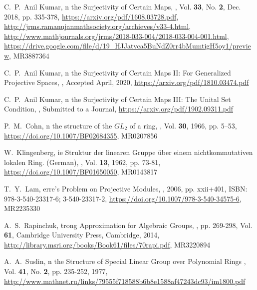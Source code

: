 \documentclass[12pt]{amsart}
\theoremstyle{plain}
\theoremstyle{definition}
\theoremstyle{remark}
\numberwithin{equation}{section}
\begin{document}
\begin{thebibliography}{1}

C.~P.~Anil Kumar,
n the {S}urjectivity of {C}ertain {M}aps,
, Vol. {\bf 33}, No. {\bf 2}, Dec. 2018, pp. 335-378, \url{https://arxiv.org/pdf/1608.03728.pdf}, \url{http://jrms.ramanujanmathsociety.org/archieves/v33-4.html}, \url{http://www.mathjournals.org/jrms/2018-033-004/2018-033-004-001.html}, \url{https://drive.google.com/file/d/19_HJJatvca5BuNdZ0rr4bMumtigH5oy1/preview}, MR3887364

C.~P.~Anil Kumar,
n the {S}urjectivity of {C}ertain {M}aps II: {F}or {G}eneralized {P}rojective {S}paces,
, Accepted April, 2020, \url{https://arxiv.org/pdf/1810.03474.pdf}

C.~P.~Anil Kumar,
n the {S}urjectivity of {C}ertain {M}aps III: {T}he {U}nital {S}et {C}ondition,
, Submitted to a Journal,
\url{https://arxiv.org/pdf/1902.09311.pdf}

P.~M.~Cohn,
n the structure of the $GL_2$ of a ring,
, Vol. {\bf 30}, 1966, pp. 5–53, \url{https://doi.org/10.1007/BF02684355}, MR0207856

W.~Klingenberg,
ie {S}truktur der linearen {G}ruppe über einem nichtkommutativen lokalen Ring. ({G}erman),
, Vol. {\bf 13}, 1962, pp. 73-81, \url{https://doi.org/10.1007/BF01650050}, MR0143817

T.~Y.~Lam,
erre's {P}roblem on {P}rojective {M}odules,
, 2006, pp. xxii+401, ISBN: 978-3-540-23317-6; 3-540-23317-2, \url{https://doi.org/10.1007/978-3-540-34575-6}, MR2235330


A.~S.~Rapinchuk,
trong {A}pproximation for {A}lgebraic {G}roups,
, pp. 269-298, Vol. {\bf 61}, Cambridge University Press, Cambridge, 2014, \url{http://library.msri.org/books/Book61/files/70rapi.pdf}, MR3220894

A.~A.~Suslin,
n the {S}tructure of {S}pecial {L}inear {G}roup over {P}olynomial {R}ings
,  Vol. {\bf 41}, No. {\bf 2}, pp. 235-252, 1977,  \url{http://www.mathnet.ru/links/79555f718588b6b8e1588af47243dc93/im1800.pdf}
\end{thebibliography}
\end{document}
